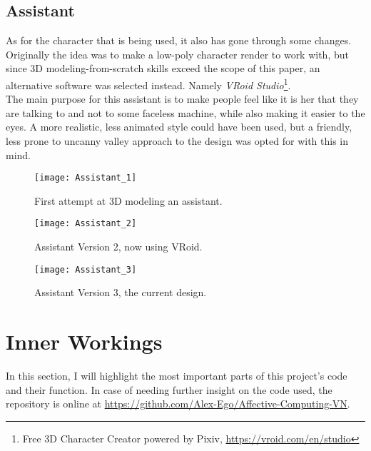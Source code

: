 \subsection{Assistant}
As for the character that is being used, it also has gone through some changes. Originally the idea was to make a low-poly character render to work with, but since 3D modeling-from-scratch skills exceed the scope of this paper, an alternative software was selected instead. Namely \textit{VRoid Studio}\footnote{Free 3D Character Creator powered by Pixiv, \url{https://vroid.com/en/studio}}.\\
The main purpose for this assistant is to make people feel like it is her that they are talking to and not to some faceless machine, while also making it easier to the eyes. A more realistic, less animated style could have been used, but a friendly, less prone to uncanny valley approach to the design was opted for with this in mind.
\begin{figure}[!bht]
	\centering
	\texttt{[image: Assistant\_1]}
	\caption{First attempt at 3D modeling an assistant.}
	\label{fig:assistant1}
\end{figure}
\begin{figure}[!bht]
	\centering
	\texttt{[image: Assistant\_2]}
	\caption{Assistant Version 2, now using VRoid.}
	\label{fig:assistant2}
\end{figure}
\begin{figure}[!bht]
	\centering
	\texttt{[image: Assistant\_3]}
	\caption{Assistant Version 3, the current design.}
	\label{fig:assistant3}
\end{figure}
\pagebreak

\section{Inner Workings}
In this section, I will highlight the most important parts of this project's code and their function. In case of needing further insight on the code used, the repository is online at \url{https://github.com/Alex-Ego/Affective-Computing-VN}.
